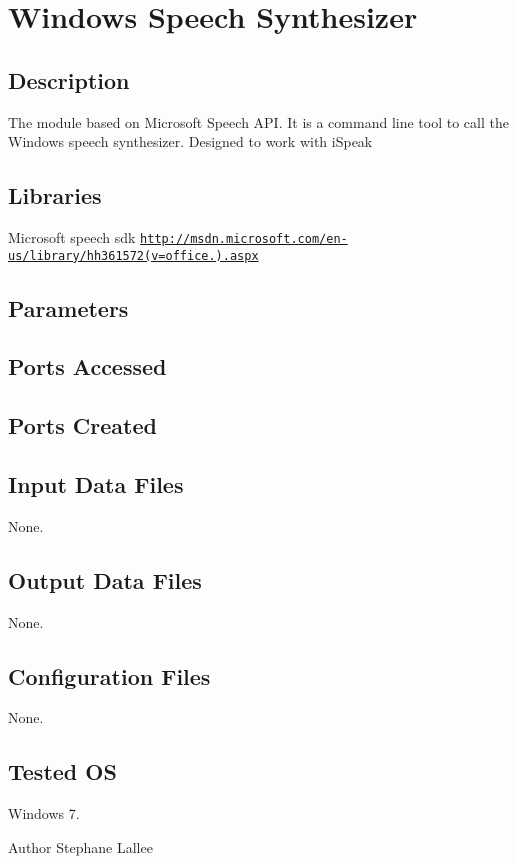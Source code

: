 \section{Windows Speech Synthesizer}
\label{group__windows-tts}
\hypertarget{group__windows-tts_intro_sec}{}\subsection{Description}\label{group__windows-tts_intro_sec}
The module based on Microsoft Speech A\+P\+I. It is a command line tool to call the Windows speech synthesizer. Designed to work with i\+Speak\hypertarget{group__windows-tts_lib_sec}{}\subsection{Libraries}\label{group__windows-tts_lib_sec}
Microsoft speech sdk \href{http://msdn.microsoft.com/en-us/library/hh361572(v=office.14).aspx}{\tt http\+://msdn.\+microsoft.\+com/en-\/us/library/hh361572(v=office.).\+aspx}\hypertarget{group__windows-tts_parameters_sec}{}\subsection{Parameters}\label{group__windows-tts_parameters_sec}
\hypertarget{group__windows-tts_portsa_sec}{}\subsection{Ports Accessed}\label{group__windows-tts_portsa_sec}
\hypertarget{group__windows-tts_portsc_sec}{}\subsection{Ports Created}\label{group__windows-tts_portsc_sec}
\hypertarget{group__windows-tts_in_files_sec}{}\subsection{Input Data Files}\label{group__windows-tts_in_files_sec}
None.\hypertarget{group__windows-tts_out_data_sec}{}\subsection{Output Data Files}\label{group__windows-tts_out_data_sec}
None.\hypertarget{group__windows-tts_conf_file_sec}{}\subsection{Configuration Files}\label{group__windows-tts_conf_file_sec}
None.\hypertarget{group__windows-tts_tested_os_sec}{}\subsection{Tested O\+S}\label{group__windows-tts_tested_os_sec}
Windows 7.

\begin{DoxyAuthor}{Author}
Stephane Lallee 
\end{DoxyAuthor}
